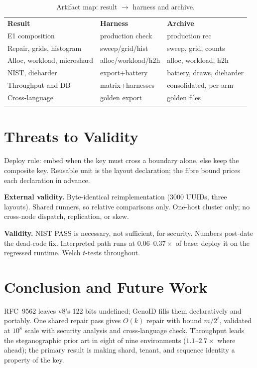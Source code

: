 \documentclass{svproc}
\begin{document}
\begin{table}[t]
\caption{Artifact map: result $\to$ harness and archive.}
\label{tab:artifact-map}
\centering\scriptsize\setlength{\tabcolsep}{3pt}
\begin{tabular}{lll}
\hline\noalign{\smallskip}
\textbf{Result} & \textbf{Harness} & \textbf{Archive} \\
\noalign{\smallskip}\hline\noalign{\smallskip}
E1 composition & production check & production rec \\
Repair, grids, histogram & sweep/grid/hist & sweep, grid, counts \\
Alloc, workload, microshard & alloc/workload/h2h & alloc, workload, h2h \\
NIST, dieharder & export+battery & battery, draws, dieharder \\
Throughput and DB & matrix+harnesses & consolidated, per-arm \\
Cross-language & golden export & golden files \\
\noalign{\smallskip}\hline
\end{tabular}
\end{table}

\section{Threats to Validity}
\label{sec:validity}
Deploy rule: embed when the key must cross a boundary alone, else keep the composite key. Reusable unit is the layout declaration; the fibre bound prices each declaration in advance.

\textbf{External validity.} Byte-identical reimplementation (3000 UUIDs, three layouts). Shared runners, so relative comparisons only. One-host cluster only; no cross-node dispatch, replication, or skew.

\textbf{Validity.} NIST PASS is necessary, not sufficient, for security. Numbers post-date the dead-code fix. Interpreted path runs at $0.06$--$0.37\times$ of base; deploy it on the regressed runtime. Welch $t$-tests throughout.

\section{Conclusion and Future Work}
\label{sec:conclusion}
RFC~9562 leaves v8's 122 bits undefined; GenoID fills them declaratively and portably. One shared repair pass gives $O(k)$ repair with bound $m/2^\ell$, validated at $10^8$ scale with security analysis and cross-language check. Throughput leads the steganographic prior art in eight of nine environments ($1.1$--$2.7\times$ where ahead); the primary result is making shard, tenant, and sequence identity a property of the key.
\end{document}
